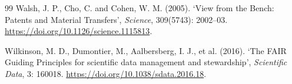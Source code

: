 \begin{thebibliography}{99}
 Walsh, J. P., Cho, C. and Cohen, W. M. (2005). `View from the Bench: Patents and Material Transfers', \emph{Science}, 309(5743): 2002--03. \url{https://doi.org/10.1126/science.1115813}.

 Wilkinson, M. D., Dumontier, M., Aalbersberg, I. J., et al. (2016). `The FAIR Guiding Principles for scientific data management and stewardship', \emph{Scientific Data}, 3: 160018. \url{https://doi.org/10.1038/sdata.2016.18}.
\end{thebibliography}
